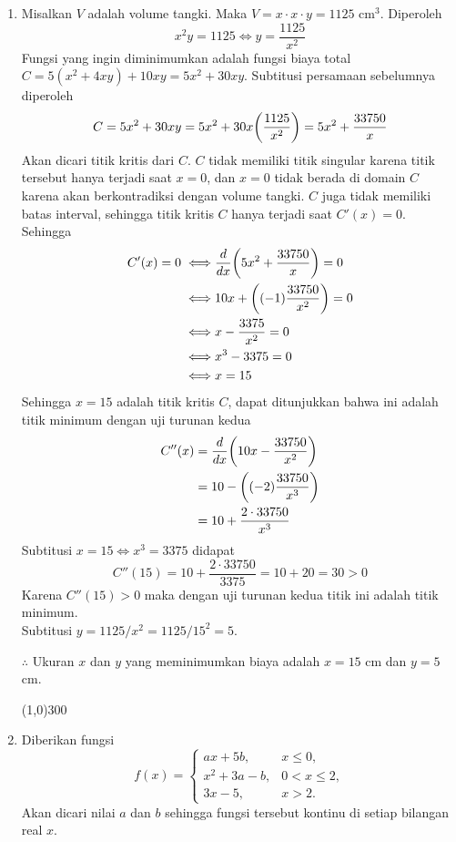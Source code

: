 \begin{enumerate}[leftmargin=*, label={\arabic*}.]
\item Misalkan $V$ adalah volume tangki. Maka $V = x \cdot x \cdot y = 1125$ cm$^{3}$.
Diperoleh
\[
x^{2}y = 1125 \iff y = \frac{1125}{x^{2}}
\]
Fungsi yang ingin diminimumkan adalah fungsi biaya total 
$C = 5(x^{2}+4xy)+10xy=5x^{2}+30xy$. Subtitusi persamaan sebelumnya diperoleh
\[
C = 5x^{2}+30xy = 5x^{2}+30x\brk*{\frac{1125}{x^{2}}} = 5x^{2}+\frac{33750}{x}
\]
Akan dicari titik kritis dari $C$. $C$ tidak memiliki titik singular karena titik 
tersebut hanya terjadi saat $x = 0$, dan $x=0$ tidak berada di domain $C$ karena akan 
berkontradiksi dengan volume tangki. $C$ juga tidak memiliki batas interval, sehingga titik 
kritis $C$ hanya terjadi saat $C'(x)=0$.
Sehingga
\begin{align*}
    C'(x) = 0 \iff &\drv{x}{5x^{2}+\frac{33750}{x}} = 0\\
    \iff & 10x+\brk*{(-1)\frac{33750}{x^{2}}} = 0\\
    \iff &x-\frac{3375}{x^{2}} = 0\\
    \iff &x^{3}-3375=0\\
    \iff &x = 15
\end{align*}
Sehingga $x=15$ adalah titik kritis $C$, dapat ditunjukkan bahwa ini adalah titik minimum 
dengan uji turunan kedua
\begin{align*}
    C''(x) &= \drv{x}{10x-\frac{33750}{x^{2}}}\\
    &= 10 - \brk*{(-2)\frac{33750}{x^{3}}}\\
    &= 10 + \frac{2\cdot 33750}{x^{3}}
\end{align*}
Subtitusi $x=15 \iff x^{3} = 3375$ didapat
\[
C''(15) = 10+\frac{2\cdot 33750}{3375} = 10 + 20 = 30 > 0
\]
Karena $C''(15)>0$ maka dengan uji turunan kedua titik ini adalah titik minimum.\\
Subtitusi $y = 1125/x^{2} = 1125/15^{2} = 5$.

$\therefore$ Ukuran $x$ dan $y$ yang meminimumkan biaya adalah $x=15$ cm dan $y=5$ cm.


\begin{center}\line(1,0){300}\end{center}


\item Diberikan fungsi
\[
    f(x)=
    \begin{cases}
        ax+5b, &x \leq 0,\\
        x^2+3a-b, &0 < x \leq 2,\\
        3x-5, &x > 2.
    \end{cases}
\]
Akan dicari nilai $a$ dan $b$ sehingga fungsi tersebut kontinu di setiap bilangan real $x$.


\end{enumerate}
